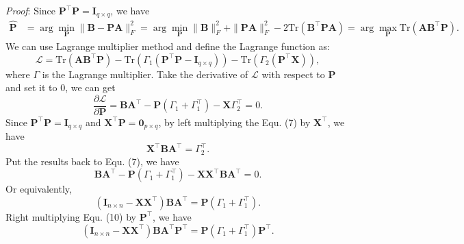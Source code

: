 \documentclass[titlepage,11pt,twoside]{article}
\begin{document}
\emph{Proof}:
Since $\mathbf{P}^{\top}\mathbf{P} = \mathbf{I}_{q\times q}$, we have
\begin{equation}
\begin{split}
\mathbf{\hat{P}}
&
=\arg\min_{\mathbf{P}}\|\mathbf{B}-\mathbf{P}\mathbf{A}\|_{F}^{2}
=\arg\min_{\mathbf{P}}\|\mathbf{B}\|_{F}^{2}+\|\mathbf{P}\mathbf{A}\|_{F}^{2}-2\text{Tr}(\mathbf{B}^{\top}\mathbf{P}\mathbf{A})
=\arg\max_{\mathbf{P}}\text{Tr}(\mathbf{A}\mathbf{B}^{\top}\mathbf{P}).
\end{split}
\end{equation}
We can use Lagrange multiplier method and define the Lagrange function as:
\begin{equation}
\mathcal{L}
=
\text{Tr}(\mathbf{A}\mathbf{B}^{\top}\mathbf{P})
-
\text{Tr}(\Gamma_{1}(\mathbf{P}^{\top}\mathbf{P} - \mathbf{I}_{q\times q}))
-
\text{Tr}(\Gamma_{2}(\mathbf{P}^{\top}\mathbf{X}))
,
\end{equation}
where $\Gamma$ is the Lagrange multiplier. Take the derivative of $\mathcal{L}$ with respect to $\mathbf{P}$ and set it to 0, we can get
\begin{equation}
\frac{\partial \mathcal{L}}{\partial \mathbf{P}} 
=
\mathbf{B}\mathbf{A}^{\top}
-
\mathbf{P}(\Gamma_{1}+\Gamma_{1}^{\top})
-
\mathbf{X}\Gamma_{2}^{\top}
=
0.
\end{equation}
Since $\mathbf{P}^{\top}\mathbf{P}=\mathbf{I}_{q\times q}$ and $\mathbf{X}^{\top}\mathbf{P} = \mathbf{0}_{p\times q}$, by left multiplying the Equ. (7) by $\mathbf{X}^{\top}$, we have 
\begin{equation}
\mathbf{X}^{\top}\mathbf{B}\mathbf{A}^{\top}
=
\Gamma_{2}^{\top}.
\end{equation}
Put the results back to Equ. (7), we have 
\begin{equation}
\mathbf{B}\mathbf{A}^{\top}
-
\mathbf{P}(\Gamma_{1}+\Gamma_{1}^{\top})
-
\mathbf{X}\mathbf{X}^{\top}\mathbf{B}\mathbf{A}^{\top}
=
0.
\end{equation}
Or equivalently,
\begin{equation}
(\mathbf{I}_{n\times n}-\mathbf{X}\mathbf{X}^{\top})\mathbf{B}\mathbf{A}^{\top}
=
\mathbf{P}(\Gamma_{1}+\Gamma_{1}^{\top}).
\end{equation}
Right multiplying Equ. (10) by $\mathbf{P}^{\top}$, we have
\begin{equation}
(\mathbf{I}_{n\times n}-\mathbf{X}\mathbf{X}^{\top})\mathbf{B}\mathbf{A}^{\top}\mathbf{P}^{\top}
=
\mathbf{P}(\Gamma_{1}+\Gamma_{1}^{\top})\mathbf{P}^{\top}
.
\end{equation}
\end{document}

